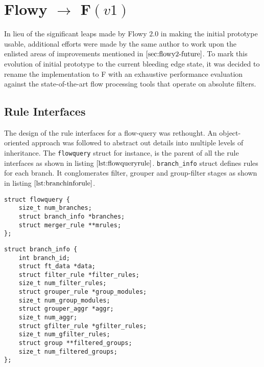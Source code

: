 \chapter{Flowy $\longrightarrow$ F$(v1)$}\label{ch:f}

In lieu of the significant leaps made by Flowy $2.0$ in making the initial
prototype usable, additional efforts were made by the same author to work upon
the enlisted areas of improvements mentioned in $\ref{sec:flowy2-future}$. To
mark this evolution of initial prototype to the current bleeding edge state,
it was decided to rename the implementation to F \cite{jschauer:2012} with an
exhaustive performance evaluation against the state-of-the-art flow processing
tools \cite{sromig:2000, phaag:2006} that operate on absolute filters.

\section{Rule Interfaces}\label{sec:rule-interfaces}

The design of the rule interfaces for a flow-query was rethought. An
object-oriented approach was followed to abstract out details into multiple
levels of inheritance. The \texttt{flowquery}  struct for instance, is the parent of all the rule
interfaces as shown in listing $\ref{lst:flowqueryrule}$.
\texttt{branch\_info} struct defines rules for each branch. It conglomerates
filter, grouper and group-filter stages as shown in listing
$\ref{lst:branchinforule}$.

\begin{lstlisting}
struct flowquery {
	size_t num_branches;
	struct branch_info *branches;
	struct merger_rule **mrules;
};
\end{lstlisting}

\begin{lstlisting}
struct branch_info {
	int branch_id;
	struct ft_data *data;
	struct filter_rule *filter_rules;
	size_t num_filter_rules;
	struct grouper_rule *group_modules;
	size_t num_group_modules;
	struct grouper_aggr *aggr;
	size_t num_aggr;
	struct gfilter_rule *gfilter_rules;
	size_t num_gfilter_rules;
	struct group **filtered_groups;
	size_t num_filtered_groups;
};
\end{lstlisting}


